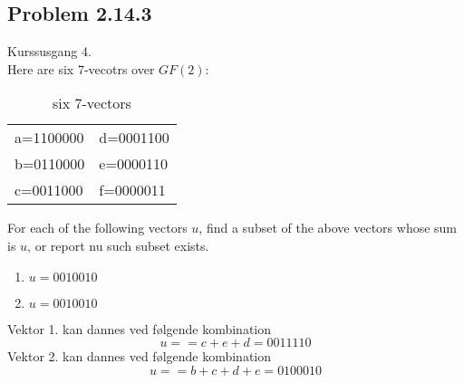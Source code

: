 \subsection{Problem 2.14.3}
Kurssusgang 4.\\
Here are six 7-vecotrs over $GF(2)$:
\begin{table}[h]
    \centering
    \begin{tabular}{|l|l|}
        \hline
        a=1100000&d=0001100\\
        b=0110000&e=0000110\\
        c=0011000&f=0000011\\\hline
    \end{tabular}
    \label{tab:fields}
    \caption{six 7-vectors}
\end{table}
For each of the following vectors $u$, find a subset of the above vectors whose sum is $u$, or report nu such subset exists.
\begin{enumerate}
    \item $u=0010010$
    \item $u=0010010$
\end{enumerate}
Vektor 1. kan dannes ved følgende kombination
\begin{equation}
    u==c+e+d=0011110
\end{equation}
Vektor 2. kan dannes ved følgende kombination
\begin{equation}
    u==b+c+d+e=0100010
\end{equation}
